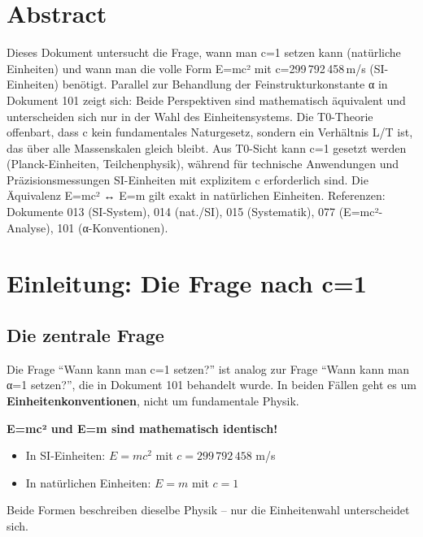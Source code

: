 \section*{Abstract}
		Dieses Dokument untersucht die Frage, wann man c=1 setzen kann (natürliche Einheiten) und wann man die volle Form E=mc² mit c=299\,792\,458\,m/s (SI-Einheiten) benötigt. Parallel zur Behandlung der Feinstrukturkonstante α in Dokument 101 zeigt sich: Beide Perspektiven sind mathematisch äquivalent und unterscheiden sich nur in der Wahl des Einheitensystems. Die T0-Theorie offenbart, dass c kein fundamentales Naturgesetz, sondern ein Verhältnis L/T ist, das über alle Massenskalen gleich bleibt. Aus T0-Sicht kann c=1 gesetzt werden (Planck-Einheiten, Teilchenphysik), während für technische Anwendungen und Präzisionsmessungen SI-Einheiten mit explizitem c erforderlich sind. Die Äquivalenz E=mc² ↔ E=m gilt exakt in natürlichen Einheiten. Referenzen: Dokumente 013 (SI-System), 014 (nat./SI), 015 (Systematik), 077 (E=mc²-Analyse), 101 (α-Konventionen).

	
	
	
	\section{Einleitung: Die Frage nach c=1}
	
	\subsection{Die zentrale Frage}
	
	Die Frage ``Wann kann man c=1 setzen?'' ist analog zur Frage ``Wann kann man α=1 setzen?'', die in Dokument 101 behandelt wurde. In beiden Fällen geht es um \textbf{Einheitenkonventionen}, nicht um fundamentale Physik.
	
	\begin{tcolorbox}[colback=blue!5!white,colframe=blue!75!black,title=Zentrale These]
		\textbf{E=mc² und E=m sind mathematisch identisch!}
		
		\begin{itemize}
			\item In SI-Einheiten: $E = mc^2$ mit $c = 299\,792\,458$ m/s
			\item In natürlichen Einheiten: $E = m$ mit $c = 1$
		\end{itemize}
		
		Beide Formen beschreiben dieselbe Physik -- nur die Einheitenwahl unterscheidet sich.
	\end{tcolorbox}
	
